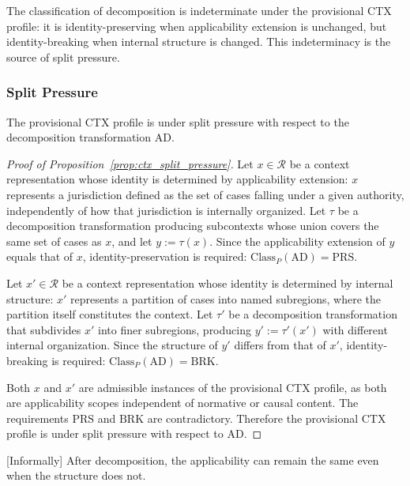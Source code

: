 The classification of decomposition is indeterminate under the provisional CTX profile:
it is identity-preserving when applicability extension is unchanged,
but identity-breaking when internal structure is changed.
This indeterminacy is the source of split pressure.


\subsubsection{Split Pressure}

\begin{proposition}
\label{prop:ctx_split_pressure}
The provisional CTX profile is under split pressure with respect to
the decomposition transformation $\mathrm{AD}$.
\end{proposition}

\begin{proof}[Proof of Proposition~\ref{prop:ctx_split_pressure}]
Let $x \in \mathcal{R}$ be a context representation whose identity is
determined by applicability extension:
$x$ represents a jurisdiction defined as the set of cases
falling under a given authority,
independently of how that jurisdiction is internally organized.
Let $\tau$ be a decomposition transformation producing subcontexts
whose union covers the same set of cases as $x$, and
let $y := \tau(x)$.
Since the applicability extension of
$y$ equals that of $x$,
identity-preservation is required:
$\mathrm{Class}_P(\mathrm{AD}) = \mathrm{PRS}$.

Let $x' \in \mathcal{R}$ be a context representation whose identity is
determined by internal structure: $x'$ represents a partition of cases
into named subregions, where the partition itself constitutes the context.
Let $\tau'$ be a decomposition transformation that subdivides $x'$
into finer subregions, producing
$y' := \tau'(x')$ with different internal organization.
Since the structure of $y'$ differs from that of $x'$,
identity-breaking is required: $\mathrm{Class}_P(\mathrm{AD}) = \mathrm{BRK}$.

Both $x$ and $x'$ are admissible instances of the provisional CTX profile,
as both are applicability scopes independent of normative or causal content.
The requirements $\mathrm{PRS}$ and $\mathrm{BRK}$ are contradictory.
Therefore the provisional CTX profile is under split pressure
with respect to $\mathrm{AD}$.
\end{proof}

[Informally]
After decomposition, the applicability can remain the same even when the structure does not.


